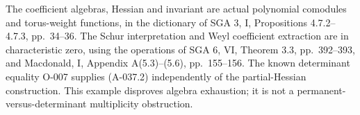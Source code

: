 The coefficient algebras, Hessian and invariant
are actual polynomial comodules and torus-weight
functions, in the dictionary of SGA 3, I,
Propositions 4.7.2--4.7.3, pp.~34--36.
The Schur interpretation and Weyl coefficient
extraction are in characteristic zero, using
the operations of SGA 6, VI, Theorem 3.3,
pp.~392--393, and Macdonald, I, Appendix
A(5.3)--(5.6), pp.~155--156.
The known determinant equality O-007 supplies
(A-037.2) independently of the partial-Hessian
construction. This example disproves algebra
exhaustion; it is not a permanent-versus-determinant
multiplicity obstruction.
